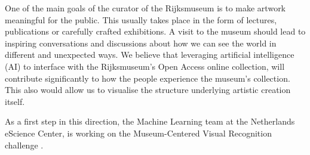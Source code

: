 \documentclass[12pt,a4paper]{report}
\begin{document}
  \par
    One of the main goals of the curator of the Rijksmuseum is to make artwork meaningful for the public. This usually takes place in the form of lectures, publications or carefully crafted exhibitions. A visit to the museum should lead to inspiring conversations and discussions about how we can see the world in different and unexpected ways. We believe that leveraging artificial intelligence (AI) to interface with the Rijksmuseum’s Open Access online collection, will contribute significantly to how the people experience the museum’s collection. This also would allow us to visualise the structure underlying artistic creation itself.

    \par
      As a first step in this direction, the Machine Learning team at the Netherlands eScience Center, is working on the Museum-Centered Visual Recognition challenge \cite{Mensink2014}. 
\end{document}
